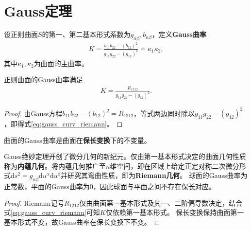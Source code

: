 \documentclass[../../main.tex]{subfiles}%
\begin{document}
\section{Gauss定理}

\begin{definition}
设正则曲面$S$的第一、第二基本形式系数为$g_{\alpha\beta},b_{\alpha\beta}$，定义\textbf{Gauss曲率}
\begin{align*}
K = \frac{b_{11}b_{22}-(b_{12})^2}{g_{11}g_{22}-(g_{12})^2} = \kappa_1\kappa_2,
\end{align*}
其中$\kappa_1,\kappa_2$为曲面的主曲率。
\end{definition}

\begin{proposition}
正则曲面的Gauss曲率满足
\begin{align}
K = \frac{R_{1212}}{g_{11}g_{22}-(g_{12})^2}. \label{eq:gauss_curv_riemann}
\end{align}
\end{proposition}

\begin{proof}

由Gauss方程$b_{11}b_{22}-(b_{12})^2=R_{1212}$，等式两边同时除以$g_{11}g_{22}-(g_{12})^2$，即得式\eqref{eq:gauss_curv_riemann}。

\end{proof}

\begin{theorem}[Gauss绝妙定理]
曲面的Gauss曲率是曲面在\textbf{保长变换}下的不变量。
\end{theorem}
\begin{remark}
Gauss绝妙定理开创了微分几何的新纪元。仅由第一基本形式决定的曲面几何性质称为\textbf{内蕴几何}。将内蕴几何推广至$n$维空间，即在区域上给定正定对称二次微分形式$\mathrm{d}s^2=g_{\alpha\beta}\mathrm{d}u^\alpha\mathrm{d}u^\beta$并研究其弯曲性质，即为\textbf{Riemann几何}。
球面的Gauss曲率为正常数，平面的Gauss曲率为$0$，因此球面与平面之间不存在保长对应。
\end{remark}
\begin{proof}

Riemann记号$R_{1212}$仅由曲面第一基本形式及其一、二阶偏导数决定，结合式\eqref{eq:gauss_curv_riemann}可知$K$仅依赖第一基本形式。
保长变换保持曲面第一基本形式不变，故Gauss曲率在保长变换下不变。

\end{proof}
\end{document}
